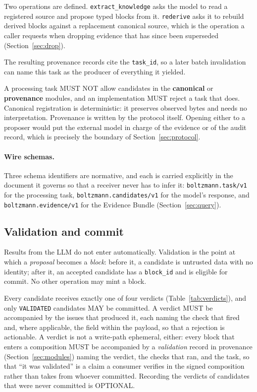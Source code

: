 \documentclass[11pt,a4paper]{article}
\begin{document}
Two operations are defined. \texttt{extract\_knowledge} asks the model to read a
registered source and propose typed blocks from it.
\texttt{rederive} asks it to rebuild derived blocks against a replacement
canonical source, which is the operation a caller requests when dropping
evidence that has since been superseded (Section~\ref{sec:drop}).

The resulting provenance records cite the \texttt{task\_id}, so a later batch
invalidation can name this task as the producer of everything it yielded.

\begin{callout}[title=Only three memory types are proposable]
A processing task MUST NOT allow candidates in the \textbf{canonical} or
\textbf{provenance} modules, and an implementation MUST reject a task that does.
Canonical registration is deterministic: it preserves observed bytes and needs
no interpretation. Provenance is written by the protocol itself. Opening either
to a proposer would put the external model in charge of the evidence or of the
audit record, which is precisely the boundary of Section~\ref{sec:protocol}.
\end{callout}

\paragraph{Wire schemas.}
Three schema identifiers are normative, and each is carried explicitly in the
document it governs so that a receiver never has to infer it:
\texttt{boltzmann.task/v1} for the processing task,
\texttt{boltzmann.candidates/v1} for the model's response, and
\texttt{boltzmann.evidence/v1} for the Evidence Bundle
(Section~\ref{sec:query}).

\subsection{Validation and commit}
\label{sec:validation}

Results from the LLM do not enter automatically. Validation is the point at
which a \emph{proposal} becomes a \emph{block}: before it, a candidate is
untrusted data with no identity; after it, an accepted candidate has a
\texttt{block\_id} and is eligible for commit. No other operation may mint a
block.

Every candidate receives exactly one of four verdicts
(Table~\ref{tab:verdicts}), and only \texttt{VALIDATED} candidates MAY be
committed. A verdict MUST be accompanied by the issues that produced it, each
naming the check that fired and, where applicable, the field within the
payload, so that a rejection is actionable. A verdict is not a write-path
ephemeral, either: every block that enters a composition MUST be accompanied
by a \emph{validation} record in provenance (Section~\ref{sec:modules}) naming
the verdict, the checks that ran, and the task, so that ``it was validated''
is a claim a consumer verifies in the signed composition rather than takes
from whoever committed. Recording the verdicts of candidates that were never
committed is OPTIONAL.
\end{document}
